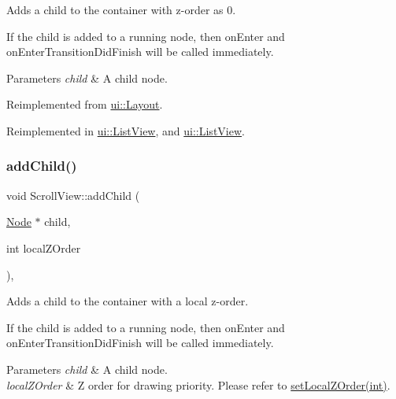 Adds a child to the container with z-\/order as 0.

If the child is added to a \textquotesingle{}running\textquotesingle{} node, then \textquotesingle{}on\+Enter\textquotesingle{} and \textquotesingle{}on\+Enter\+Transition\+Did\+Finish\textquotesingle{} will be called immediately.


\begin{DoxyParams}{Parameters}
{\em child} & A child node. \\
\hline
\end{DoxyParams}


Reimplemented from \hyperlink{classui_1_1Layout_a5d22ede0db71db1d5b597207f1c2013e}{ui\+::\+Layout}.



Reimplemented in \hyperlink{classui_1_1ListView_a7fb7f42f3f3ee9e9ca8ee3bb959e2c32}{ui\+::\+List\+View}, and \hyperlink{classui_1_1ListView_aeee2116f21f0e89de5a2e1b9cc93e012}{ui\+::\+List\+View}.

\mbox{\label{classui_1_1ScrollView_a42849e8b7b80ca0bcee880f40de9eccd}} 
\subsubsection{\texorpdfstring{add\+Child()}{addChild()}\hspace{0.1cm}{\footnotesize\ttfamily [2/8]}}
{\footnotesize\ttfamily void Scroll\+View\+::add\+Child (\begin{DoxyParamCaption}\item[{\hyperlink{classNode}{Node} $\ast$}]{child,  }\item[{int}]{local\+Z\+Order }\end{DoxyParamCaption})\hspace{0.3cm}{\ttfamily [override]}, {\ttfamily [virtual]}}

Adds a child to the container with a local z-\/order.

If the child is added to a \textquotesingle{}running\textquotesingle{} node, then \textquotesingle{}on\+Enter\textquotesingle{} and \textquotesingle{}on\+Enter\+Transition\+Did\+Finish\textquotesingle{} will be called immediately.


\begin{DoxyParams}{Parameters}
{\em child} & A child node. \\
\hline
{\em local\+Z\+Order} & Z order for drawing priority. Please refer to {\ttfamily \hyperlink{classNode_aee4e616c2d55b722226aae1e68b4946f}{set\+Local\+Z\+Order(int)}}. \\
\hline
\end{DoxyParams}


